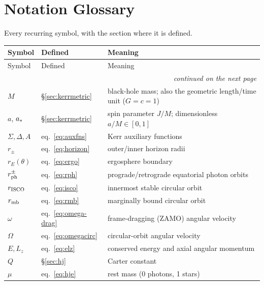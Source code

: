 \chapter{Notation Glossary}
\label{app:glossary}

Every recurring symbol, with the section where it is defined.

\begingroup
\footnotesize
\setlength{}
\setlength{}
\begin{longtable}{llp{}}
\toprule
Symbol & Defined & Meaning \\
\midrule
\endfirsthead
\toprule
Symbol & Defined & Meaning \\
\midrule
\endhead
\midrule
\multicolumn{3}{r}{\emph{continued on the next page}} \\
\endfoot
\bottomrule
\endlastfoot
$M$ & \S\ref{sec:kerrmetric} & black-hole mass; also the geometric
length/time unit ($G=c=1$) \\
$a$, $a_*$ & \S\ref{sec:kerrmetric} & spin parameter $J/M$;
dimensionless $a/M \in [0,1]$ \\
$\Sigma, \Delta, A$ & eq.~\eqref{eq:auxfns} & Kerr auxiliary functions \\
$r_\pm$ & eq.~\eqref{eq:horizon} & outer/inner horizon radii \\
$r_E(\theta)$ & eq.~\eqref{eq:ergo} & ergosphere boundary \\
$r_{\rm ph}^\pm$ & eq.~\eqref{eq:rph} & prograde/retrograde equatorial
photon orbits \\
$r_{\rm ISCO}$ & eq.~\eqref{eq:isco} & innermost stable circular orbit \\
$r_{\rm mb}$ & eq.~\eqref{eq:rmb} & marginally bound circular orbit \\
$\omega$ & eq.~\eqref{eq:omega-drag} & frame-dragging (ZAMO) angular
velocity \\
$\Omega$ & eq.~\eqref{eq:omegacirc} & circular-orbit angular velocity \\
$E, L_z$ & eq.~\eqref{eq:elz} & conserved energy and axial angular
momentum \\
$Q$ & \S\ref{sec:hj} & Carter constant \\
$\mu$ & eq.~\eqref{eq:hje} & rest mass (0 photons, 1 stars) \\

\end{longtable}
